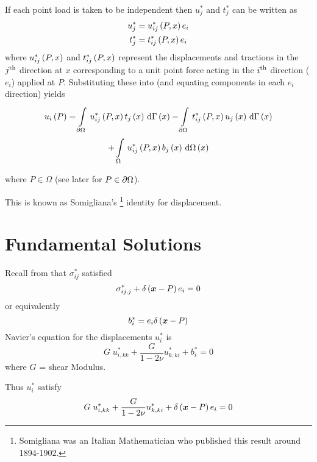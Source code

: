 If each point load is taken to be independent then $u_{j}^{*}$ and $t_{j}^{*}$
can be written as
\begin{align}
  u_{j}^{*} &=  u_{ij}^{*}\left( P,x \right)  e_{i} \\
  t_{j}^{*} &=  t_{ij}^{*}\left( P,x \right)  e_{i}
\end{align}
where $ u_{ij}^{*}\left( P,x \right) $ and $ t_{ij}^{*}\left( P,x \right) $ represent the
displacements and tractions in the ${j}^{\text{th}}$ direction at $x$ corresponding to
a unit point force acting in the ${i}^{\text{th}}$ direction ($e_{i}$) applied at $P$.
Substituting these into  (and equating components in each
$e_{i}$ direction) yields
\begin{multline}
  \fnof{u_{i}}{P} = \gint{\del \Omega}{}{\fnof{u_{ij}^{*}}{P,x}
    \fnof{t_{j}}{x}}{\fnof{\Gamma}{x}} - \gint{\del
    \Omega}{}{\fnof{t_{ij}^{*}}{P,x} \fnof{u_{j}}{x}}{\fnof{\Gamma}{x}} \\ 
  + \gint{\Omega}{}{\fnof{u_{ij}^{*}}{P,x}
    \fnof{b_{j}}{x}}{\fnof{\Omega}{x}}
 \label{eqn:eqnF}
\end{multline}

where $P \in \Omega$ (see later for $P \in \partial\Omega$).

This is known as Somigliana's \footnote{Somigliana was an Italian
  Mathematician who published this result around 1894-1902.} identity for
displacement.

\section{Fundamental Solutions}

Recall from  that $\sigma_{ij}^{*}$ satisfied
\begin{equation}
  \sigma_{ij,j}^{*} +  \delta\left(  \boldsymbol{x}  - P \right) e_{i}  = 0 
\end{equation} 
or equivalently
\begin{displaymath}
  b_{i}^{*} = e_{i}  \delta\left(  \boldsymbol{x}  - P \right) 
\end{displaymath}
Navier's equation for the displacements $u_{i}^{*}$ is
\begin{displaymath}
  G\;u_{i,kk}^{*}  +  \dfrac{G}{1-2\nu}u_{k,ki}^{*}  + b_{i}^{*} = 0 
\end{displaymath}
where $G$ = shear Modulus.

Thus $u_{i}^{*}$ satisfy
\begin{equation}
  G\;u_{i,kk}^{*}  +  \dfrac{G}{1-2\nu}u_{k,ki}^{*} +  \delta\left(  \boldsymbol{x}  -
    P \right) e_{i} = 0 
  \label{eqn:satisfy}
\end{equation}

